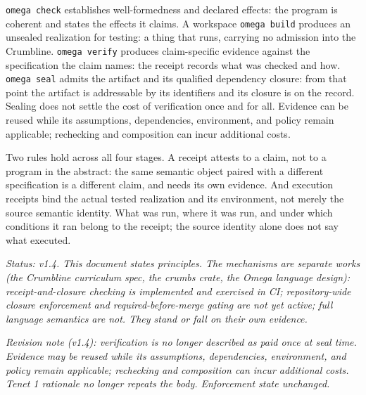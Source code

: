 \documentclass[11pt]{article}
\begin{document}
\texttt{omega check} establishes well-formedness and declared effects: the program is coherent and states the effects it claims. A workspace \texttt{omega build} produces an unsealed realization for testing: a thing that runs, carrying no admission into the Crumbline. \texttt{omega verify} produces claim-specific evidence against the specification the claim names: the receipt records what was checked and how. \texttt{omega seal} admits the artifact and its qualified dependency closure: from that point the artifact is addressable by its identifiers and its closure is on the record. Sealing does not settle the cost of verification once and for all. Evidence can be reused while its assumptions, dependencies, environment, and policy remain applicable; rechecking and composition can incur additional costs.

Two rules hold across all four stages. A receipt attests to a claim, not to a program in the abstract: the same semantic object paired with a different specification is a different claim, and needs its own evidence. And execution receipts bind the actual tested realization and its environment, not merely the source semantic identity. What was run, where it was run, and under which conditions it ran belong to the receipt; the source identity alone does not say what executed.

\bigskip
\noindent\textit{Status: v1.4. This document states principles. The mechanisms are separate works (the Crumbline curriculum spec, the crumbs crate, the Omega language design): receipt-and-closure checking is implemented and exercised in CI; repository-wide closure enforcement and required-before-merge gating are not yet active; full language semantics are not. They stand or fall on their own evidence.}

\bigskip
\noindent\textit{Revision note (v1.4): verification is no longer described as paid once at seal time. Evidence may be reused while its assumptions, dependencies, environment, and policy remain applicable; rechecking and composition can incur additional costs. Tenet 1 rationale no longer repeats the body. Enforcement state unchanged.}
\end{document}
